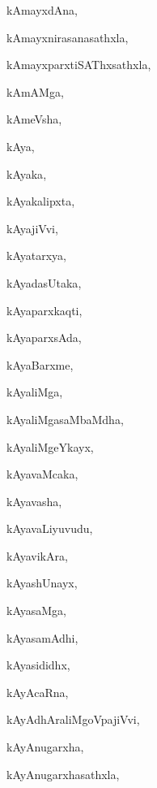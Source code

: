 \begin{multicols}{3}
{\noindent
{kAmayxdAna}, \pageref{kAmayxdAna}

\noindent
{kAmayxnirasanasathxla}, \pageref{kAmayxnirasanasathxla}

\noindent
{kAmayxparxtiSAThxsathxla}, \pageref{kAmayxparxtiSAThxsathxla}

\noindent
{kAmAMga}, \pageref{kAmAMga}

\noindent
{kAmeVsha}, \pageref{kAmeVsha}

\noindent
{kAya}, \pageref{kAya}

\noindent
{kAyaka}, \pageref{kAyaka}

\noindent
{kAyakalipxta}, \pageref{kAyakalipxta}

\noindent
{kAyajiVvi}, \pageref{kAyajiVvi}

\noindent
{kAyatarxya}, \pageref{kAyatarxya}

\noindent
{kAyadasUtaka}, \pageref{kAyadasUtaka}

\noindent
{kAyaparxkaqti}, \pageref{kAyaparxkaqti}

\noindent
{kAyaparxsAda}, \pageref{kAyaparxsAda}

\noindent
{kAyaBarxme}, \pageref{kAyaBarxme}

\noindent
{kAyaliMga}, \pageref{kAyaliMga}

\noindent
{kAyaliMgasaMbaMdha}, \pageref{kAyaliMgasaMbaMdha}

\noindent
{kAyaliMgeYkayx}, \pageref{kAyaliMgeYkayx}

\noindent
{kAyavaMcaka}, \pageref{kAyavaMcaka}

\noindent
{kAyavasha}, \pageref{kAyavasha}

\noindent
{kAyavaLiyuvudu}, \pageref{kAyavaLiyuvudu}

\noindent
{kAyavikAra}, \pageref{kAyavikAra}

\noindent
{kAyashUnayx}, \pageref{kAyashUnayx}

\noindent
{kAyasaMga}, \pageref{kAyasaMga}

\noindent
{kAyasamAdhi}, \pageref{kAyasamAdhi}

\noindent
{kAyasididhx}, \pageref{kAyasididhx}

\noindent
{kAyAcaRna}, \pageref{kAyAcaRna}

\noindent
{kAyAdhAraliMgoVpajiVvi}, \pageref{kAyAdhAraliMgoVpajiVvi}

\noindent
{kAyAnugarxha}, \pageref{kAyAnugarxha}

\noindent
{kAyAnugarxhasathxla}, \pageref{kAyAnugarxhasathxla}

}
\end{multicols}
